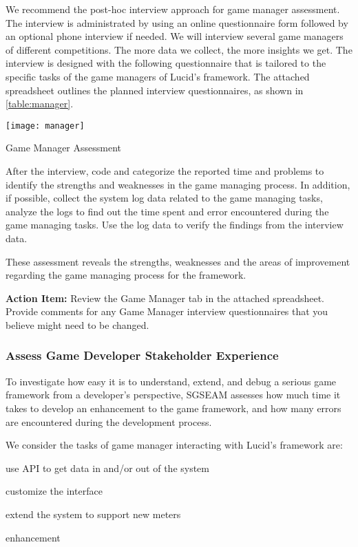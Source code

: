 We recommend the post-hoc interview approach for game manager assessment. The interview is administrated by using an online questionnaire form followed by an optional phone interview if needed. We will interview several game managers of different competitions. The more data we collect, the more insights we get.  The interview is designed with the following questionnaire that is tailored to the specific tasks of the game managers of Lucid's framework. The attached spreadsheet outlines the planned interview questionnaires, as shown in \autoref{table:manager}.

\begin{table}[ht!]
  \center
  \texttt{[image: manager]}
  \caption{Game Manager Assessment}
  \label{table:manager}
\end{table}

After the interview, code and categorize the reported time and problems to identify the strengths and weaknesses in the game managing process. In addition, if possible, collect the system log data related to the game managing tasks, analyze the logs to find out the time spent and error encountered during the game managing tasks. Use the log data to verify the findings from the interview data.

These assessment reveals the strengths, weaknesses and the areas of improvement regarding the game managing process for the framework.

\begin{shadebox}
{\bf Action Item:} Review the Game Manager tab in the attached
spreadsheet.  Provide comments for any Game Manager interview questionnaires that
you believe might need to be changed. 
\end{shadebox}

\subsubsection{Assess Game Developer Stakeholder Experience}

To investigate how easy it is to understand, extend, and debug a serious game framework from a developer's 
perspective, SGSEAM assesses how much time it takes to develop an
enhancement to the game framework, and how many errors are encountered
during the development process.

We consider the tasks of game manager interacting with Lucid's framework are:

\begin{compactenum}
  \item use API to get data in and/or out of the system
  \item customize the interface
  \item extend the system to support new meters
  \item enhancement
\end{compactenum}

